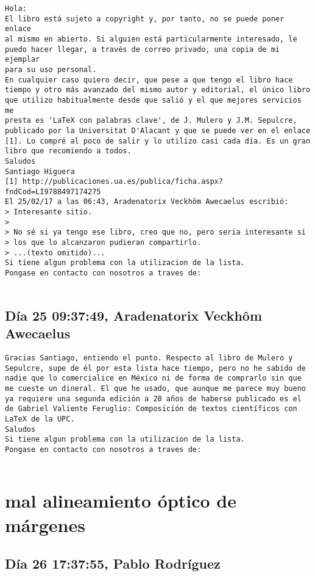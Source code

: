 \documentclass[a4paper,10pt]{article}
\begin{document}
\begin{lstlisting}
Hola:
El libro está sujeto a copyright y, por tanto, no se puede poner enlace 
al mismo en abierto. Si alguien está particularmente interesado, le 
puedo hacer llegar, a través de correo privado, una copia de mi ejemplar 
para su uso personal.
En cualquier caso quiero decir, que pese a que tengo el libro hace 
tiempo y otro más avanzado del mismo autor y editorial, el único libro 
que utilizo habitualmente desde que salió y el que mejores servicios me 
presta es 'LaTeX con palabras clave', de J. Mulero y J.M. Sepulcre, 
publicado por la Universitat D'Alacant y que se puede ver en el enlace 
[1]. Lo compré al poco de salir y lo utilizo casi cada día. Es un gran 
libro que recomiendo a todos.
Saludos
Santiago Higuera
[1] http://publicaciones.ua.es/publica/ficha.aspx?fndCod=LI9788497174275
El 25/02/17 a las 06:43, Aradenatorix Veckhôm Awecaelus escribió:
> Interesante sitio.
>
> No sé si ya tengo ese libro, creo que no, pero seria interesante si
> los que lo alcanzaron pudieran compartirlo.
> ...(texto omitido)...
Si tiene algun problema con la utilizacion de la lista.
Pongase en contacto con nosotros a traves de:


\end{lstlisting}

\subsection{Día 25 09:37:49, Aradenatorix Veckhôm Awecaelus}

\begin{lstlisting}
Gracias Santiago, entiendo el punto. Respecto al libro de Mulero y
Sepulcre, supe de él por esta lista hace tiempo, pero no he sabido de
nadie que lo comercialice en México ni de forma de comprarlo sin que
me cueste un dineral. El que he usado, que aunque me parece muy bueno
ya requiere una segunda edición a 20 años de haberse publicado es el
de Gabriel Valiente Feruglio: Composición de textos científicos con
LaTeX de la UPC.
Saludos
Si tiene algun problema con la utilizacion de la lista.
Pongase en contacto con nosotros a traves de:


\end{lstlisting}
\section{mal alineamiento óptico de márgenes}

\subsection{Día 26 17:37:55, Pablo Rodríguez}
\end{document}
